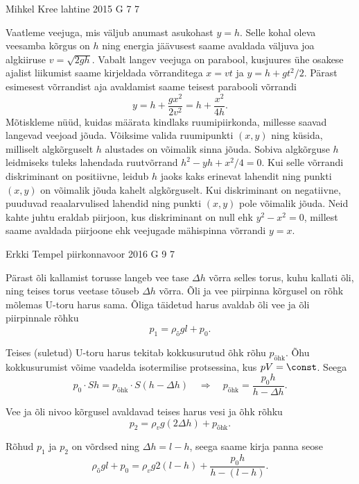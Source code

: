 \documentclass[11pt]{article}
\begin{document}
{%
{Mihkel Kree} %
{lahtine} %
{2015} %
{G 7} %
{7} %
{

\ifSolution
Vaatleme veejuga, mis väljub anumast asukohast $y=h$. Selle kohal oleva veesamba kõrgus on $h$ ning energia jäävusest saame avaldada väljuva joa algkiiruse $v=\sqrt{2gh}$. Vabalt langev veejuga on parabool, kusjuures ühe osakese ajalist liikumist saame kirjeldada võrranditega $x=vt$ ja $y=h+gt^2/2$. Pärast esimesest võrrandist aja avaldamist saame teisest parabooli võrrandi
\[
y = h + \frac{gx^2}{2v^2} = h + \frac{x^2}{4h}.
\]
Mõtiskleme nüüd, kuidas määrata kindlaks ruumipiirkonda, millesse saavad langevad veejoad jõuda. Võiksime valida ruumipunkti $(x,y)$ ning küsida, milliselt algkõrguselt $h$ alustades on võimalik sinna jõuda. Sobiva algkõrguse $h$ leidmiseks tuleks lahendada ruutvõrrand $h^2 - yh + x^2/4 = 0$. Kui selle võrrandi diskriminant on positiivne, leidub $h$ jaoks kaks erinevat lahendit ning punkti $(x,y)$ on võimalik jõuda kahelt algkõrguselt. Kui diskriminant on negatiivne, puuduvad reaalarvulised lahendid ning punkti $(x,y)$ pole võimalik jõuda. Neid kahte juhtu eraldab piirjoon, kus diskriminant on null ehk $y^2 - x^2=0$, millest saame avaldada piirjoone ehk veejugade mähispinna võrrandi $y=x$.
\fi
}

{Erkki Tempel} %
{piirkonnavoor} %
{2016} %
{G 9} %
{7} %
{

\ifSolution
Pärast õli kallamist torusse langeb vee tase $\Delta h$ võrra selles torus, kuhu kallati õli, ning teises torus veetase tõuseb $\Delta h$ võrra. Õli ja vee piirpinna kõrgusel on rõhk mõlemas U-toru harus sama. Õliga täidetud harus avaldab õli vee ja õli piirpinnale rõhku
\[ p_1 = \rho_{\text{õ}}gl + p_0.\]

Teises (suletud) U-toru harus tekitab kokkusurutud õhk rõhu $p_{\text{õhk}}$. Õhu kokkusurumist võime vaadelda isotermilise protsessina, kus $pV = \const$. Seega
\[ p_0\cdot Sh = p_{\text{õhk}}\cdot S(h-\Delta h) \quad\Rightarrow\quad p_{\text{õhk}} = \frac{p_0h}{h-\Delta h}.\]

Vee ja õli nivoo kõrgusel avaldavad teises harus vesi ja õhk rõhku
\[ p_2 = \rho_vg(2\Delta h) + p_{\text{õhk}}.\]

Rõhud $p_1$ ja $p_2$ on võrdsed ning $\Delta h = l - h$, seega saame kirja panna seose
\[ \rho_{\text{õ}}gl + p_0 = \rho_vg2(l-h) + \frac{p_0h}{h-(l-h)}.\]

}}
\end{document}

